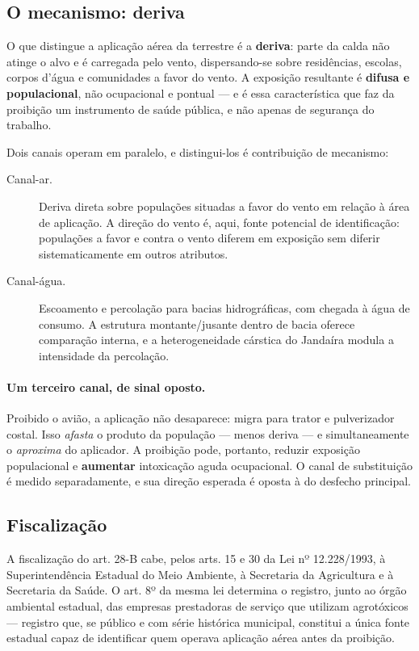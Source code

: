 \subsection{O mecanismo: deriva}
\label{sub:deriva}

O que distingue a aplicação aérea da terrestre é a \textbf{deriva}: parte da
calda não atinge o alvo e é carregada pelo vento, dispersando-se sobre
residências, escolas, corpos d'água e comunidades a favor do vento. A exposição
resultante é \textbf{difusa e populacional}, não ocupacional e pontual --- e é
essa característica que faz da proibição um instrumento de saúde pública, e não
apenas de segurança do trabalho.

Dois canais operam em paralelo, e distingui-los é contribuição de mecanismo:

\begin{description}
  \item[Canal-ar.] Deriva direta sobre populações situadas a favor do vento em
    relação à área de aplicação. A direção do vento é, aqui, fonte potencial de
    identificação: populações a favor e contra o vento diferem em exposição sem
    diferir sistematicamente em outros atributos.

  \item[Canal-água.] Escoamento e percolação para bacias hidrográficas, com
    chegada à água de consumo. A estrutura montante/jusante dentro de bacia
    oferece comparação interna, e a heterogeneidade cárstica do Jandaíra modula a
    intensidade da percolação.
\end{description}

\paragraph{Um terceiro canal, de sinal oposto.} Proibido o avião, a aplicação não
desaparece: migra para trator e pulverizador costal. Isso \emph{afasta} o produto
da população --- menos deriva --- e simultaneamente o \emph{aproxima} do
aplicador. A proibição pode, portanto, reduzir exposição populacional e
\textbf{aumentar} intoxicação aguda ocupacional. O canal de substituição é
medido separadamente, e sua direção esperada é oposta à do desfecho principal.

\subsection{Fiscalização}
\label{sub:enforcement}

A fiscalização do art. 28-B cabe, pelos arts. 15 e 30 da Lei nº 12.228/1993, à
Superintendência Estadual do Meio Ambiente, à Secretaria da Agricultura e à
Secretaria da Saúde. O art. 8º da mesma lei determina o registro, junto ao órgão
ambiental estadual, das empresas prestadoras de serviço que utilizam agrotóxicos
--- registro que, se público e com série histórica municipal, constitui a única
fonte estadual capaz de identificar quem operava aplicação aérea antes da
proibição.

